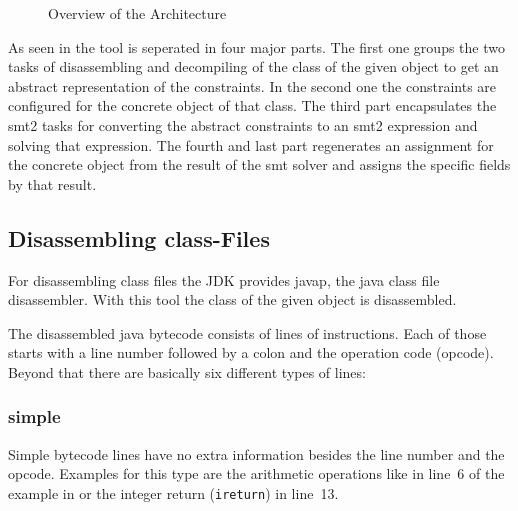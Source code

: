 \documentclass[conference]{IEEEtran}
\begin{document}
\begin{figure*}
  \centering
  \tikzarchitecture
  \caption{Overview of the Architecture}
  \label{fig:architecture}
\end{figure*}


As seen in  the tool is seperated in four major
parts. The first one groups the two tasks of disassembling and decompiling of
the class of the given object to get an abstract representation of the
constraints. In the second one the constraints are configured for the concrete
object of that class. The third part encapsulates the smt2 tasks for
converting the abstract constraints to an smt2 expression and solving that
expression. The fourth and last part regenerates an assignment for the
concrete object from the result of the smt solver and assigns the specific
fields by that result.

\subsection{Disassembling class-Files}
\label{sec:impl_disassembling}

For disassembling class files the JDK provides javap, the java class file
disassembler. With this tool the class of the given object is disassembled.


The disassembled java bytecode consists of lines of instructions. Each of those
starts with a line number followed by a colon and the operation code (opcode).
Beyond that there are basically six different types of lines:

\subsubsection{simple}
\label{sec:impl_disa_simple}

Simple bytecode lines have no extra information besides the line number and the
opcode. Examples for this type are the arithmetic operations like in line~6 of
the example in  or the integer return
(\texttt{ireturn}) in line~13.
\end{document}
